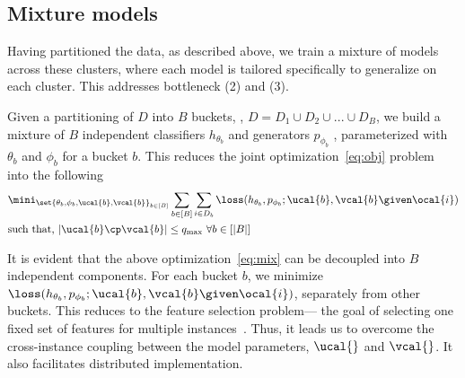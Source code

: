 \documentclass[letterpaper]{article}
\renewcommand{\cite}{\citep}
\begin{document}
\subsection{Mixture models}
Having partitioned the data, as described above, we train a mixture of models across these clusters, where each model is tailored specifically to generalize on each cluster. This addresses bottleneck (2) and (3). 


 Given a partitioning of $D$ into $B$ buckets, \ie,  $D = D_1 \cup D_2 \cup ... \cup D_B$, we build a mixture of $B$ independent classifiers $h_{\theta_b} $ and generators  $  p_{\phi_b}$ , parameterized with $\theta_b$ and $\phi_b$ for a bucket $b$. This reduces the joint optimization~\eqref{eq:obj} problem into the following 
\begin{align}
& \mini_{\set{\theta_b,\phi_b,\ucal{b},\vcal{b}}_{b\in [B]}} \sum_{b\in [B]}\sum_{i\in D_b}\loss(h_{\theta_b},p_{\phi_b};\ucal{b}, \vcal{b} \given \ocal{i}) \nonumber \\
& \text{such that,} \   |\ucal{b} \cp \vcal{b}| \le q_{\max}  \ \forall b\in [|B|]  \label{eq:mix}
\end{align}

It is evident that the above optimization~\eqref{eq:mix} can be decoupled into $B$ independent components. For each bucket $b$, we minimize $\loss(h_{\theta_b},p_{\phi_b};\ucal{b} , \vcal{b} \given \ocal{i})$, separately from other buckets.  This reduces to the feature selection problem--- the goal of selecting one fixed set of features for multiple instances~\cite{elenberg2018restricted}. Thus, it leads us to overcome the cross-instance coupling between the model parameters, $\ucal{}$ and $\vcal{}$. It also facilitates distributed implementation.
\vspace{-2mm}
\end{document}
